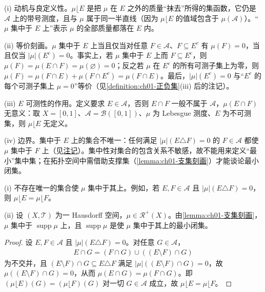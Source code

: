 \documentclass[../../main.tex]{subfiles}%
\begin{document}
\begin{remark}\label{remark:ch01-集中测度动机}
(i) 动机与良定义性。$\mu\lfloor E$ 是把 $\mu$ 在 $E$ 之外的质量“抹去”所得的集函数，它仍是 $\mathcal{A}$ 上的带号测度，且与 $\mu$ 属于同一半直线（因为 $\mu\lfloor E$ 的值域包含于 $\mu(\mathcal{A})$）。“$\mu$ 集中于 $E$ 上”表示 $\mu$ 的全部质量都落在 $E$ 内。

(ii) 等价刻画。$\mu$ 集中于 $E$ 上当且仅当对任意 $F\in\mathcal{A}$、$F\subseteq E^c$ 有 $\mu(F)=0$，当且仅当 $|\mu|(E^c)=0$。事实上，若 $\mu$ 集中于 $E$ 上而 $F\subseteq E^c$，则 $\mu(F)=\mu(E\cap F)=\mu(\varnothing)=0$；反之若 $\mu$ 在 $E^c$ 的所有可测子集上为零，则 $\mu(F)=\mu(F\cap E)+\mu(F\cap E^c)=\mu(F\cap E)$。最后，$|\mu|(E^c)=0$ 与“$E^c$ 的每个可测子集上 $\mu=0$”等价（见\cref{definition:ch01-正负集}(iii) 后的注记）。

(iii) $E$ 可测性的作用。定义要求 $E\in\mathcal{A}$，否则 $E\cap F$ 一般不属于 $\mathcal{A}$，$\mu(E\cap F)$ 无意义：取 $X=[0,1]$、$\mathcal{A}=\mathcal{B}([0,1])$、$\mu$ 为 Lebesgue 测度、$E$ 为不可测集，则 $\mu\lfloor E$ 无定义。

(iv) 边界。集中于 $E$ 上的集合不唯一：任何满足 $|\mu|(E\triangle F)=0$ 的 $F\in\mathcal{A}$ 都使 $\mu$ 集中于 $F$ 上（见\hyperref[remark:ch01-集中注记]{注记}）。集中性对集合的包含关系不敏感，故不能用来定义“最小”集中集；在拓扑空间中需借助支撑集（\cref{lemma:ch01-支集刻画}）才能谈论最小闭集。
\end{remark}

\begin{remark}\label{remark:ch01-集中注记}
(i) 不存在唯一的集合使 $\mu$ 集中于其上。例如，若 $E,F\in\mathcal{A}$ 且 $|\mu|(E\triangle F)=0$，则 $\mu\lfloor E=\mu\lfloor F$。

(ii) 设 $(X,\mathcal{T})$ 为一 Hausdorff 空间，$\mu\in\mathscr{R}^+(X)$。由\cref{lemma:ch01-支集刻画}，$\mu$ 集中于 $\operatorname{supp}\mu$ 上，且 $\operatorname{supp}\mu$ 是使 $\mu$ 集中于其上的最小闭集。
\end{remark}

\begin{proof}
设 $E,F\in\mathcal{A}$ 且 $|\mu|(E\triangle F)=0$。对任意 $G\in\mathcal{A}$，
\begin{align*}
E\cap G=(F\cap G)\cup((E\setminus F)\cap G)
\end{align*}
为不交并，且 $(E\setminus F)\cap G\subseteq E\triangle F$ 满足 $|\mu|((E\setminus F)\cap G)=0$，故 $\mu((E\setminus F)\cap G)=0$，从而 $\mu(E\cap G)=\mu(F\cap G)$。即 $(\mu\lfloor E)(G)=(\mu\lfloor F)(G)$ 对一切 $G\in\mathcal{A}$ 成立，故 $\mu\lfloor E=\mu\lfloor F$。
\end{proof}
\end{document}
